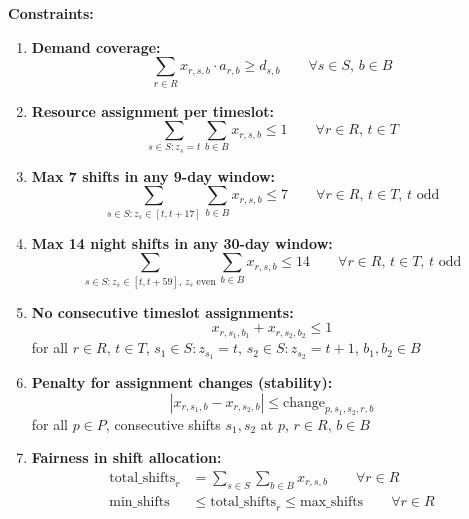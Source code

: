 \documentclass{article}
\begin{document}
\textbf{Constraints:}
\begin{enumerate}
    \item \textbf{Demand coverage:}
    \[
        \sum_{r \in R} x_{r,s,b} \cdot a_{r,b} \geq d_{s,b} \qquad \forall s \in S,\, b \in B
    \]
    \item \textbf{Resource assignment per timeslot:}
    \[
        \sum_{s \in S: z_s = t} \sum_{b \in B} x_{r,s,b} \leq 1 \qquad \forall r \in R,\, t \in T
    \]
    \item \textbf{Max 7 shifts in any 9-day window:}
    \[
        \sum_{s \in S: z_s \in [t, t+17]} \sum_{b \in B} x_{r,s,b} \leq 7 \qquad \forall r \in R,\, t \in T,\, t \text{ odd}
    \]
    \item \textbf{Max 14 night shifts in any 30-day window:}
    \[
        \sum_{s \in S: z_s \in [t, t+59],\, z_s \text{ even}} \sum_{b \in B} x_{r,s,b} \leq 14 \qquad \forall r \in R,\, t \in T,\, t \text{ odd}
    \]
    \item \textbf{No consecutive timeslot assignments:}
    \[
        x_{r,s_1,b_1} + x_{r,s_2,b_2} \leq 1
    \]
    for all $r \in R$, $t \in T$, $s_1 \in S: z_{s_1}=t$, $s_2 \in S: z_{s_2}=t+1$, $b_1, b_2 \in B$
    \item \textbf{Penalty for assignment changes (stability):}
    \[
        |x_{r,s_1,b} - x_{r,s_2,b}| \leq \text{change}_{p,s_1,s_2,r,b}
    \]
    for all $p \in P$, consecutive shifts $s_1,s_2$ at $p$, $r \in R$, $b \in B$
    \item \textbf{Fairness in shift allocation:}
    \begin{align*}
        \text{total\_shifts}_r &= \sum_{s \in S} \sum_{b \in B} x_{r,s,b} \qquad \forall r \in R \\
        \text{min\_shifts} &\leq \text{total\_shifts}_r \leq \text{max\_shifts} \qquad \forall r \in R
    \end{align*}
\end{enumerate}
\end{document}
